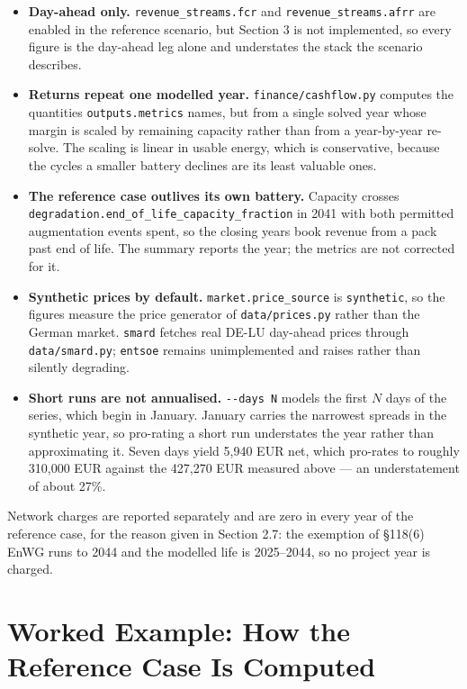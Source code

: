 \documentclass[11pt,a4paper]{article}
\numberwithin{equation}{section}
\begin{document}
\begin{itemize}
  \item \textbf{Day-ahead only.} \nolinkurl{revenue_streams.fcr} and
        \nolinkurl{revenue_streams.afrr} are enabled in the reference scenario,
        but Section 3 is not implemented, so every figure is the day-ahead leg
        alone and understates the stack the scenario describes.
  \item \textbf{Returns repeat one modelled year.} \nolinkurl{finance/cashflow.py}
        computes the quantities \nolinkurl{outputs.metrics} names, but from a
        single solved year whose margin is scaled by remaining capacity rather
        than from a year-by-year re-solve. The scaling is linear in usable
        energy, which is conservative, because the cycles a smaller battery
        declines are its least valuable ones.
  \item \textbf{The reference case outlives its own battery.} Capacity crosses
        \nolinkurl{degradation.end_of_life_capacity_fraction} in 2041 with both
        permitted augmentation events spent, so the closing years book revenue
        from a pack past end of life. The summary reports the year; the metrics
        are not corrected for it.
  \item \textbf{Synthetic prices by default.} \nolinkurl{market.price_source}
        is \texttt{synthetic}, so the figures measure the price generator of
        \nolinkurl{data/prices.py} rather than the German market.
        \texttt{smard} fetches real DE-LU day-ahead prices through
        \nolinkurl{data/smard.py}; \texttt{entsoe} remains unimplemented and
        raises rather than silently degrading.
  \item \textbf{Short runs are not annualised.} \texttt{-{}-days N} models the
        first $N$ days of the series, which begin in January. January carries
        the narrowest spreads in the synthetic year, so pro-rating a short run
        understates the year rather than approximating it. Seven days yield
        5{,}940 EUR net, which pro-rates to roughly 310{,}000 EUR against the
        427{,}270 EUR measured above --- an understatement of about 27\%.
\end{itemize}

Network charges are reported separately and are zero in every year of the
reference case, for the reason given in Section 2.7: the exemption of
\S118(6) EnWG runs to 2044 and the modelled life is 2025--2044, so no project
year is charged.

\section{Worked Example: How the Reference Case Is Computed}
\end{document}
